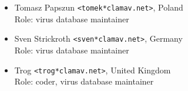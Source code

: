 \documentclass[a4paper,titlepage,12pt]{article}
\newcommand{\email}[1]{\texttt{#1}}
\begin{document}
\begin{itemize}
	\item Tomasz Papszun \email{<tomek*clamav.net>}, Poland\\
	Role: virus database maintainer

	\item Sven Strickroth \email{<sven*clamav.net>}, Germany\\
	Role: virus database maintainer

	\item Trog \email{<trog*clamav.net>}, United Kingdom\\
	Role: coder, virus database maintainer
    \end{itemize}
\end{document}
